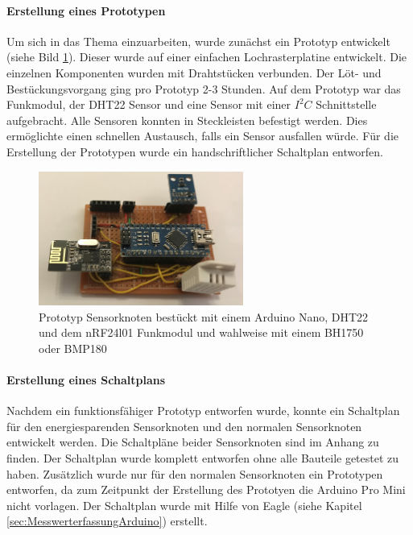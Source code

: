 \paragraph{Erstellung eines Prototypen} Um sich in das Thema einzuarbeiten, wurde zunächst ein Prototyp entwickelt (siehe Bild \ref{img:prototyp}). Dieser wurde auf einer einfachen Lochrasterplatine entwickelt. Die einzelnen Komponenten wurden mit Drahtstücken verbunden. Der Löt- und Bestückungsvorgang ging pro Prototyp 2-3 Stunden. Auf dem Prototyp war das Funkmodul, der DHT22 Sensor und eine Sensor mit einer $I^2C$ Schnittstelle aufgebracht. Alle Sensoren konnten in Steckleisten befestigt werden. Dies ermöglichte einen schnellen Austausch, falls ein Sensor ausfallen würde. Für die Erstellung der Prototypen wurde ein handschriftlicher Schaltplan entworfen.
\begin{figure}
	\centering
	\includegraphics[width=0.6\textwidth]{bilder/prototyp}
	\caption[Prototyp Sensorknoten]{ Prototyp Sensorknoten bestückt mit einem Arduino Nano, DHT22 und dem nRF24l01 Funkmodul und wahlweise mit einem BH1750 oder BMP180}
	\label{img:prototyp}
\end{figure}

\paragraph{Erstellung eines Schaltplans} Nachdem ein funktionsfähiger Prototyp entworfen wurde, konnte ein Schaltplan für den energiesparenden Sensorknoten und den normalen Sensorknoten entwickelt werden. Die Schaltpläne beider Sensorknoten sind im Anhang zu finden. Der Schaltplan wurde komplett entworfen ohne alle Bauteile getestet zu haben. Zusätzlich wurde nur für den normalen Sensorknoten ein Prototypen entworfen, da zum Zeitpunkt der Erstellung des Prototyen die Arduino Pro Mini nicht vorlagen. Der Schaltplan wurde mit Hilfe von Eagle (siehe Kapitel \ref{sec:MesswerterfassungArduino}) erstellt.
